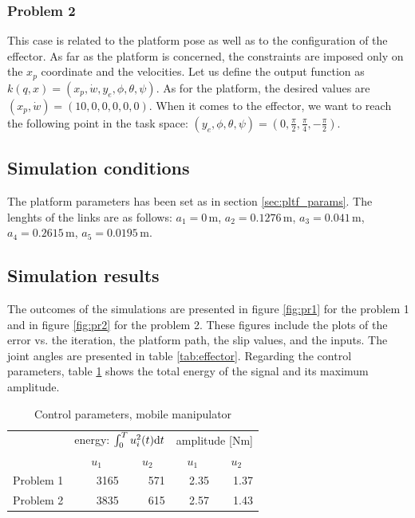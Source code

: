 \subsubsection{Problem 2}
This case is related to the platform pose as well as to the configuration of the effector.
As far as the platform is concerned, the constraints are imposed only on the $x_p$ coordinate and
the velocities. Let us define the output function as $k(q, x) = (x_p, \dot w, y_e, \phi, \theta, \psi)$.
As for the platform, the desired values are
$(x_p, \dot{w}) = (10, 0, 0, 0, 0, 0)$. When it comes to
the effector, we want to reach the following point in the task space: $(y_e, \phi, \theta, \psi)
= (0, \frac{\pi}{2}, \frac{\pi}{4}, -\frac{\pi}{2})$.

\subsection{Simulation conditions}
The platform parameters has been set as in section \ref{sec:pltf_params}. The lenghts of the links
are as follows: $a_1=0 \,\mathrm{m}$,
$a_2=0.1276 \,\mathrm{m}$,
$a_3=0.041 \,\mathrm{m}$,
$a_4=0.2615 \,\mathrm{m}$,
$a_5=0.0195 \,\mathrm{m}$.

\subsection{Simulation results}
The outcomes of the simulations are presented in figure \ref{fig:pr1} for the problem 1 and in figure
\ref{fig:pr2} for the problem 2. These figures include the plots of the error vs. the
iteration, the platform path, the slip values, and the inputs. The joint angles are
presented in table \ref{tab:effector}. Regarding the control parameters, table \ref{tab:in_eff}
shows the total energy of the signal and its maximum amplitude.

\begin{table}[!htb]
\caption{Control parameters, mobile manipulator}
\label{tab:in_eff}
\centering
\begin{tabular}{l|r|r|r|r|}
\cline{2-5}
\multicolumn{1}{c|}{}             & \multicolumn{2}{c|}{energy: $\int_0^Tu_i^2(t)\mathrm{d} t$}                             & \multicolumn{2}{c|}{amplitude [$\mathrm{Nm}$]}                          \\ \cline{2-5} 
\multicolumn{1}{c|}{}             & \multicolumn{1}{c|}{$u_1$} & \multicolumn{1}{c|}{$u_2$} & \multicolumn{1}{c|}{$u_1$} & \multicolumn{1}{c|}{$u_2$} \\ \hline
\multicolumn{1}{|l|}{Problem 1} & 3165                       & 571                        & 2.35                       & 1.37                       \\ \hline
\multicolumn{1}{|l|}{Problem 2} & 3835                       & 615                        & 2.57                       & 1.43                       \\ \hline
\end{tabular}
\end{table}

